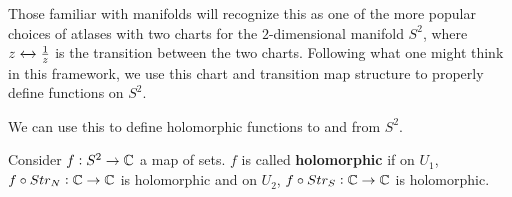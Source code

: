\begin{remark}
Those familiar with manifolds will recognize this as one of the more popular choices of atlases with two charts for the $2$-dimensional manifold $S^2$, where $z \xleftrightarrow[]{} \frac{1}{z}$ is the transition between the two charts. Following what one might think in this framework, we use this chart and transition map structure to properly define functions on $S^2$.
\end{remark}


We can use this to define holomorphic functions to and from $S^2$.


\begin{definition}

Consider $f: S^2 \to \mathbb{C}$ a map of sets. $f$ is called \textbf{holomorphic} if on $U_1$, $f \circ Str_N: \mathbb{C} \to \mathbb{C}$ is holomorphic and on $U_2$, $f \circ Str_S: \mathbb{C} \to \mathbb{C}$ is holomorphic.
\end{definition}


























